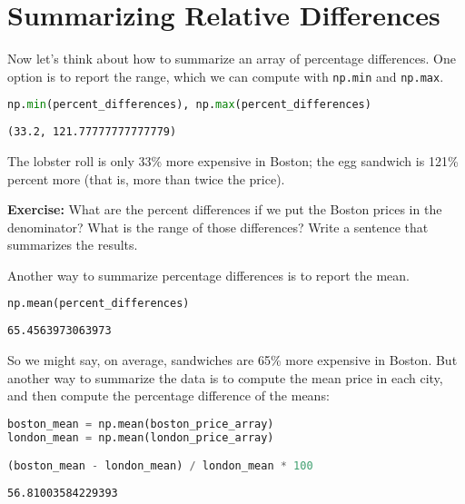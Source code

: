 \hypertarget{summarizing-relative-differences}{%
\section{Summarizing Relative
Differences}\label{summarizing-relative-differences}}

Now let's think about how to summarize an array of percentage
differences. One option is to report the range, which we can compute
with \passthrough{\lstinline!np.min!} and
\passthrough{\lstinline!np.max!}.

\begin{lstlisting}[language=Python,style=source]
np.min(percent_differences), np.max(percent_differences)
\end{lstlisting}

\begin{lstlisting}[style=output]
(33.2, 121.77777777777779)
\end{lstlisting}

The lobster roll is only 33\% more expensive in Boston; the egg sandwich
is 121\% percent more (that is, more than twice the price).

\textbf{Exercise:} What are the percent differences if we put the Boston
prices in the denominator? What is the range of those differences? Write
a sentence that summarizes the results.

Another way to summarize percentage differences is to report the mean.

\begin{lstlisting}[language=Python,style=source]
np.mean(percent_differences)
\end{lstlisting}

\begin{lstlisting}[style=output]
65.4563973063973
\end{lstlisting}

So we might say, on average, sandwiches are 65\% more expensive in
Boston. But another way to summarize the data is to compute the mean
price in each city, and then compute the percentage difference of the
means:

\begin{lstlisting}[language=Python,style=source]
boston_mean = np.mean(boston_price_array)
london_mean = np.mean(london_price_array)

(boston_mean - london_mean) / london_mean * 100
\end{lstlisting}

\begin{lstlisting}[style=output]
56.81003584229393
\end{lstlisting}

